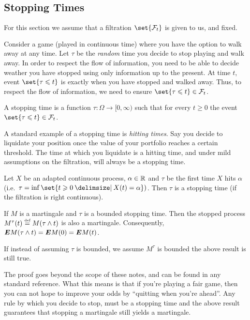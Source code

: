 \subsection{Stopping Times}

For this section we assume that a filtration $\set{\mathcal F_t}$ is given to us, and fixed.

Consider a game (played in continuous time) where you have the option to walk away at any time.
Let $\tau$ be the \emph{random} time you decide to stop playing and walk away.
In order to respect the flow of information, you need to be able to decide weather you have stopped using only information up to the present.
At time $t$, event $\set{\tau \leq t}$ is exactly when you have stopped and walked away.
Thus, to respect the flow of information, we need to ensure $\set{\tau \leq t} \in \mathcal F_t$.

\begin{definition}
  A stopping time is a function $\tau\colon \Omega \to [0, \infty)$ such that for every $t \geq 0$ the event $\set{\tau \leq t} \in \mathcal F_t$.
\end{definition}

A standard example of a stopping time is \emph{hitting times}.
Say you decide to liquidate your position once the value of your portfolio reaches a certain threshold.
The time at which you liquidate is a hitting time, and under mild assumptions on the filtration, will always be a stopping time.

\begin{proposition}
  Let $X$ be an adapted continuous process, $\alpha \in \mathbb{R}$ and $\tau$ be the first time $X$ hits $\alpha$ (i.e.\ $\tau  = \inf\set{t \geq 0 \st X(t) = \alpha })$.
  Then $\tau$ is a stopping time (if the filtration is right continuous).
\end{proposition}

\begin{theorem}
  If $M$ is a martingale and $\tau$ is a bounded stopping time.
  Then the stopped process $M^\tau(t) \stackrel{\scriptscriptstyle\textup{def}}{=} M(\tau \wedge t)$ is also a martingale.
  Consequently, $\bm{E} M(\tau \wedge t) = \bm{E} M(0) = \bm{E} M(t)$.
\end{theorem}
\begin{remark}
  If instead of assuming $\tau$ is bounded, we assume $M^\tau$ is bounded the above result is still true.
\end{remark}

The proof goes beyond the scope of these notes, and can be found in any standard reference.
What this means is that if you're playing a fair game, then you can not hope to improve your odds by ``quitting when you're ahead''.
Any rule by which you decide to stop, must be a stopping time and the above result guarantees that stopping a martingale still yields a martingale.

